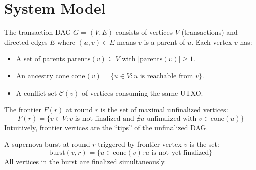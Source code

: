 \section{System Model}

\label{sec:model}

\begin{definition}
The transaction DAG $G = (V, E)$ consists of vertices $V$ (transactions) and directed
edges $E$ where $(u, v) \in E$ means $v$ is a parent of $u$. Each vertex $v$ has:
\begin{itemize}[nosep]
\item A set of parents $\text{parents}(v) \subseteq V$ with $|\text{parents}(v)| \geq 1$.
\item An ancestry cone $\text{cone}(v) = \{u \in V : u \text{ is reachable from } v\}$.
\item A conflict set $\mathcal{C}(v)$ of vertices consuming the same UTXO.
\end{itemize}
\end{definition}

\begin{definition}[Frontier]
The frontier $F(r)$ at round $r$ is the set of maximal unfinalized vertices:
\[
F(r) = \{v \in V : v \text{ is not finalized and } \nexists u \text{ unfinalized with } v \in \text{cone}(u)\}
\]
Intuitively, frontier vertices are the ``tips'' of the unfinalized DAG.
\end{definition}

\begin{definition}
A supernova burst at round $r$ triggered by frontier vertex $v$ is the set:
\[
\text{burst}(v, r) = \{u \in \text{cone}(v) : u \text{ is not yet finalized}\}
\]
All vertices in the burst are finalized simultaneously.
\end{definition}

